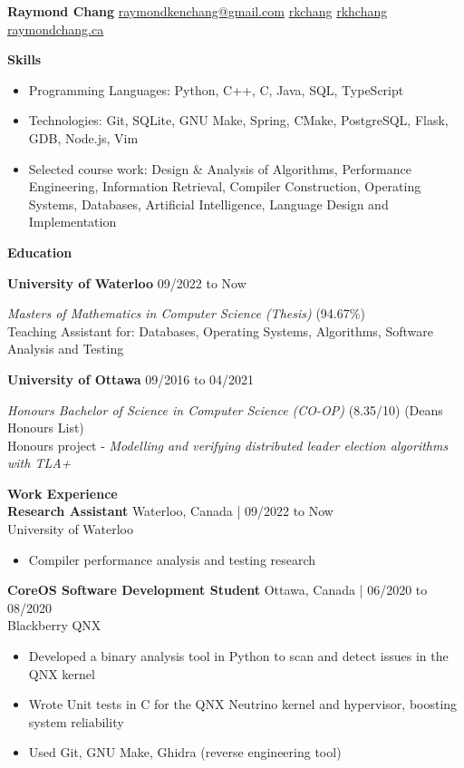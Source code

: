 \documentclass[10pt]{article}
\begin{document}
{\huge\textbf{Raymond Chang}} \space\space
{} \href{mailto:raymondkenchang@gmail.com}{raymondkenchang@gmail.com}  \space\space
{} \href{https://github.com/rkchang}{rkchang} \space\space
{} \href{https://linkedin.com/in/rkhchang}{rkhchang} \space\space
{} \href{https://raymondchang.ca/}{raymondchang.ca}

\bigskip

{\Large\textbf{Skills}}\space \hrulefill
\begin{itemize}
    \item Programming Languages: Python, C++, C, Java, SQL, TypeScript
    \item Technologies: Git, SQLite, GNU Make, Spring, CMake, PostgreSQL, Flask, GDB, Node.js, Vim
    \item Selected course work: Design \& Analysis of Algorithms, Performance Engineering, Information Retrieval, Compiler Construction, Operating Systems, Databases, Artificial Intelligence, Language Design and Implementation
\end{itemize}

\smallskip

{\Large\textbf{Education}}\space \hrulefill

\textbf{University of Waterloo} \hfill  09/2022 to Now

\textit{Masters of Mathematics in Computer Science (Thesis)} (94.67\%) \\
Teaching Assistant for: Databases, Operating Systems, Algorithms, Software Analysis and Testing

\textbf{University of Ottawa} \hfill 09/2016 to 04/2021

\textit{Honours Bachelor of Science in Computer Science (CO-OP)} (8.35/10) (Deans Honours List) \\ 
Honours project - \textit{Modelling and verifying distributed leader election algorithms with TLA+}

\smallskip

{\Large\textbf{Work Experience}}\space \hrulefill \\
\textbf{Research Assistant} \hfill Waterloo, Canada | 09/2022 to Now \\
University of Waterloo
\begin{itemize}
    \item Compiler performance analysis and testing research
\end{itemize}

\textbf{CoreOS Software Development Student} \hfill Ottawa, Canada | 06/2020 to 08/2020 \\
Blackberry QNX
\begin{itemize}
    \item Developed a binary analysis tool in Python to scan and detect issues in the QNX kernel
    \item Wrote Unit tests in C for the QNX Neutrino kernel and hypervisor, boosting system reliability
    \item Used Git, GNU Make, Ghidra (reverse engineering tool)
\end{itemize}
\end{document}
